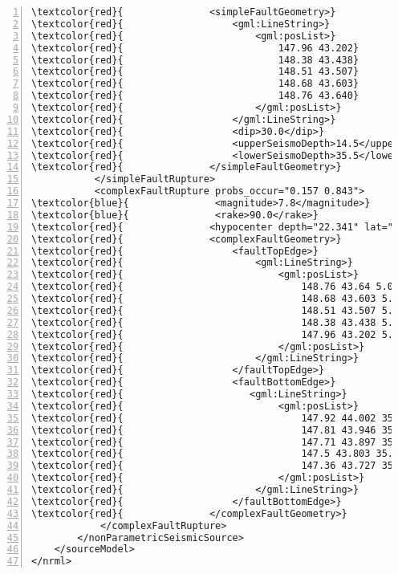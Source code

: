 \begin{Verbatim}[frame=single, commandchars=\\\{\}, fontsize=\footnotesize,
    numbers=left, numbersep=2pt]
\textcolor{red}{               <simpleFaultGeometry>}
\textcolor{red}{                   <gml:LineString>}
\textcolor{red}{                       <gml:posList>}
\textcolor{red}{                           147.96 43.202}
\textcolor{red}{                           148.38 43.438}
\textcolor{red}{                           148.51 43.507}
\textcolor{red}{                           148.68 43.603}
\textcolor{red}{                           148.76 43.640}
\textcolor{red}{                       </gml:posList>}
\textcolor{red}{                   </gml:LineString>}
\textcolor{red}{                   <dip>30.0</dip>}
\textcolor{red}{                   <upperSeismoDepth>14.5</upperSeismoDepth>}
\textcolor{red}{                   <lowerSeismoDepth>35.5</lowerSeismoDepth>}
\textcolor{red}{               </simpleFaultGeometry>}
           </simpleFaultRupture>
           <complexFaultRupture probs_occur="0.157 0.843">
\textcolor{blue}{               <magnitude>7.8</magnitude>}
\textcolor{blue}{               <rake>90.0</rake>}
\textcolor{red}{               <hypocenter depth="22.341" lat="43.624" lon="147.94"/>}
\textcolor{red}{               <complexFaultGeometry>}
\textcolor{red}{                   <faultTopEdge>}
\textcolor{red}{                       <gml:LineString>}
\textcolor{red}{                           <gml:posList>}
\textcolor{red}{                               148.76 43.64 5.0}
\textcolor{red}{                               148.68 43.603 5.0}
\textcolor{red}{                               148.51 43.507 5.0}
\textcolor{red}{                               148.38 43.438 5.0}
\textcolor{red}{                               147.96 43.202 5.0}
\textcolor{red}{                           </gml:posList>}
\textcolor{red}{                       </gml:LineString>}
\textcolor{red}{                   </faultTopEdge>}
\textcolor{red}{                   <faultBottomEdge>}
\textcolor{red}{                      <gml:LineString>}
\textcolor{red}{                           <gml:posList>}
\textcolor{red}{                               147.92 44.002 35.5}
\textcolor{red}{                               147.81 43.946 35.5}
\textcolor{red}{                               147.71 43.897 35.5}
\textcolor{red}{                               147.5 43.803 35.5}
\textcolor{red}{                               147.36 43.727 35.5}
\textcolor{red}{                           </gml:posList>}
\textcolor{red}{                       </gml:LineString>}
\textcolor{red}{                   </faultBottomEdge>}
\textcolor{red}{               </complexFaultGeometry>}
            </complexFaultRupture>
        </nonParametricSeismicSource>
    </sourceModel>
</nrml>
\end{Verbatim}
